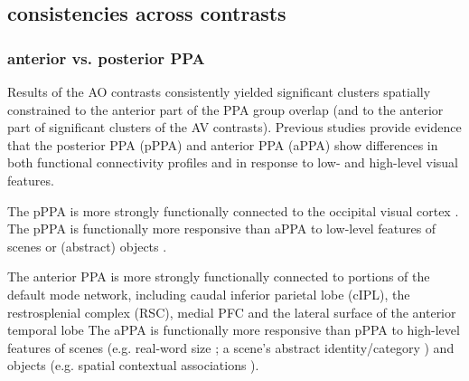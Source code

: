 \documentclass[english]{article}
\begin{document}
\subsection{consistencies across contrasts}


\subsubsection{anterior vs. posterior PPA}

Results of the AO contrasts consistently yielded significant clusters spatially
constrained to the anterior part of the PPA group overlap (and to the anterior
part of significant clusters of the AV contrasts).
Previous studies provide evidence that the posterior PPA (pPPA) and anterior PPA
(aPPA) show differences in both functional connectivity profiles and in
response to low- and high-level visual features.

The pPPA is more strongly functionally connected to the occipital visual cortex
\citep{baldassano2013differential, baldassano2016two}.
The pPPA is functionally more responsive than aPPA to low-level features of
scenes or (abstract) objects \citep{baldassano2013differential,
nasr2014thinking, rajimehr2011parahippocampal}.

The anterior PPA is more strongly functionally connected to portions of the
default mode network, including caudal inferior parietal lobe (cIPL), the
restrosplenial complex (RSC), medial PFC and the lateral surface of the anterior
temporal lobe \citep{baldassano2013differential, baldassano2016two}
The aPPA is functionally more responsive than pPPA to high-level features of
scenes (e.g. real-word size \citep{park2015parametric}; a scene's abstract
identity/category \citep{marchette2015outside, watson2016patterns}) and objects
(e.g. spatial contextual associations \citep{aminoff2007parahippocampal,
aminoff2013role}).

\end{document}
